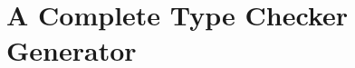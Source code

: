\section{A Complete Type Checker Generator}

\begin{code}%
\>[0]\AgdaSpace{}%
\AgdaSpace{}%
\<%
\end{code}
